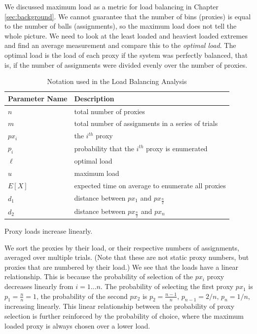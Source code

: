 We discussed maximum load as a metric for load balancing in Chapter \ref{sec:background}. We cannot guarantee that the number of bins (proxies) is equal to the number of balls (assignments), so the maximum load does not tell the whole picture. We need to look at the least loaded and heaviest loaded extremes and find an average measurement and compare this to the \textit{optimal load}. The optimal load is the load of each proxy if the system was perfectly balanced, that is, if the number of assignments were divided evenly over the number of proxies.

\begin{table}[h]
  \centering
	\begin{tabular}{ll}
	\hline
	\cline{1-2}
	Parameter Name    & Description  \\
	\hline
    $n$     & total number of proxies \\
    $m$     & total number of assignments in a series of trials \\
    $px_i$  & the $i^{th}$ proxy \\
    $p_i$   & probability that the $i^{th}$ proxy is enumerated \\
	$\ell$     & optimal load \\
	$u$     & maximum load \\
    $E[X]$  & expected time on average to enumerate all proxies \\
    $d_1$ & distance between $px_1$ and $px_{\frac{n}{2}}$ \\
    $d_2$ & distance between $px_{\frac{n}{2}}$ and $px_n$ \\
	\hline
	\end{tabular}
  \caption{Notation used in the Load Balancing Analysis}
  \label{tab:vars}
\end{table}

\begin{lemma}{Proxy loads increase linearly.}

We sort the proxies by their load, or their respective numbers of assignments, averaged over multiple trials. (Note that these are not static proxy numbers, but proxies that are numbered by their load.) We see that the loads have a linear relationship. This is because the probability of selection of the $px_i$ proxy decreases linearly from $i=1...n$. The probability of selecting the first proxy $px_1$ is $p_1=\frac{n}{n}=1$, the probability of the second $px_2$ is $p_2=\frac{n-1}{n}$, $p_{n-1}=2/n$, $p_{n}=1/n$, increasing linearly. This linear relationship between the probability of proxy selection is further reinforced by the probability of choice, where the maximum loaded proxy is always chosen over a lower load.
\end{lemma}

